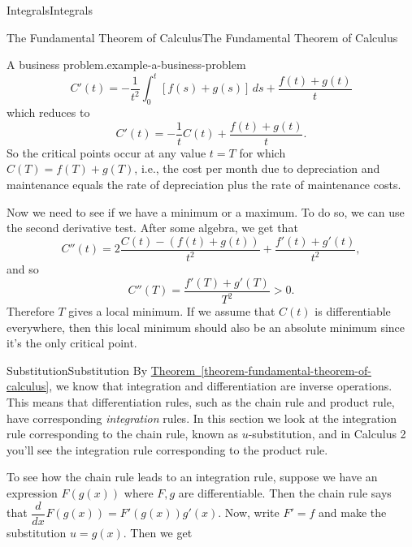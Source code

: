 \documentclass[10pt,]{book}
\numberwithin{equation}{section}
\newcommand{\dv}[3][]{\dfrac{d^{#1} #2}{d #3^{#1}}}
\begin{document}
\begin{chapterptx}{Integrals}{}{Integrals}{}{}
\begin{sectionptx}{The Fundamental Theorem of Calculus}{}{The Fundamental Theorem of Calculus}{}{}
\begin{example}{A business problem.}{example-a-business-problem}
\begin{equation*}
C'(t) = -\frac{1}{t^{2}}\int_{0}^{t}[f(s)+g(s)]\,ds + \frac{f(t) + g(t)}{t}
\end{equation*}
which reduces to%
\begin{equation*}
C'(t) = -\frac{1}{t}C(t) + \frac{f(t) + g(t)}{t}.
\end{equation*}
So the critical points occur at any value \(t = T\) for which \(C(T) = f(T) + g(T)\), i.e., the cost per month due to depreciation and maintenance equals the rate of depreciation plus the rate of maintenance costs.%
\par
\hypertarget{p-476}{}%
Now we need to see if we have a minimum or a maximum. To do so, we can use the second derivative test. After some algebra, we get that%
\begin{equation*}
C''(t) = 2\frac{C(t) - (f(t) + g(t))}{t^{2}} + \frac{f'(t) + g'(t)}{t^{2}},
\end{equation*}
and so%
\begin{equation*}
C''(T) = \frac{f'(T) + g'(T)}{T^{2}} >0.
\end{equation*}
Therefore \(T\) gives a local minimum. If we assume that \(C(t)\) is differentiable everywhere, then this local minimum should also be an absolute minimum since it's the only critical point.%
\end{example}
\end{sectionptx}
%
%
\typeout{************************************************}
\typeout{************************************************}
%
\begin{sectionptx}{Substitution}{}{Substitution}{}{}\label{section-substitution}
\hypertarget{p-477}{}%
By \hyperref[theorem-fundamental-theorem-of-calculus]{Theorem~\ref{theorem-fundamental-theorem-of-calculus}}, we know that integration and differentiation are inverse operations. This means that differentiation rules, such as the chain rule and product rule, have corresponding \emph{integration} rules. In this section we look at the integration rule corresponding to the chain rule, known as \(u\)-substitution, and in Calculus 2 you'll see the integration rule corresponding to the product rule.%
\par
\hypertarget{p-478}{}%
To see how the chain rule leads to an integration rule, suppose we have an expression \(F(g(x))\) where \(F,g\) are differentiable. Then the chain rule says that \(\dv{}{x}F(g(x)) = F'(g(x))g'(x).\) Now, write \(F' = f\) and make the substitution \(u = g(x)\). Then we get%
\begin{equation*}

\end{equation*}
\end{sectionptx}
\end{chapterptx}
\end{document}
